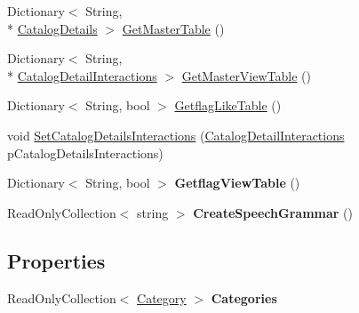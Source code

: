 \begin{DoxyCompactItemize}
\item 
Dictionary$<$ String, \\*
\hyperlink{class_microsoft_1_1_samples_1_1_kinect_1_1_basic_interactions_1_1_catalog_details}{Catalog\-Details} $>$ \hyperlink{class_microsoft_1_1_samples_1_1_kinect_1_1_basic_interactions_1_1_model_a2ac69e7c8492e2e2cc5f05e0161d93be}{Get\-Master\-Table} ()
\item 
Dictionary$<$ String, \\*
\hyperlink{class_microsoft_1_1_samples_1_1_kinect_1_1_basic_interactions_1_1_catalog_detail_interactions}{Catalog\-Detail\-Interactions} $>$ \hyperlink{class_microsoft_1_1_samples_1_1_kinect_1_1_basic_interactions_1_1_model_aa1f19e798038e6cbee46a436bd383e05}{Get\-Master\-View\-Table} ()
\item 
Dictionary$<$ String, bool $>$ \hyperlink{class_microsoft_1_1_samples_1_1_kinect_1_1_basic_interactions_1_1_model_ab18db1e36529e2e0be680ed79eac10fa}{Getflag\-Like\-Table} ()
\item 
void \hyperlink{class_microsoft_1_1_samples_1_1_kinect_1_1_basic_interactions_1_1_model_ad3fde59dd9d718855794ef7e2f98adad}{Set\-Catalog\-Details\-Interactions} (\hyperlink{class_microsoft_1_1_samples_1_1_kinect_1_1_basic_interactions_1_1_catalog_detail_interactions}{Catalog\-Detail\-Interactions} p\-Catalog\-Details\-Interactions)
\item 
\hypertarget{class_microsoft_1_1_samples_1_1_kinect_1_1_basic_interactions_1_1_model_a9e24fe88b4389b0fa84d39f70ee35a98}{Dictionary$<$ String, bool $>$ {\bfseries Getflag\-View\-Table} ()}\label{class_microsoft_1_1_samples_1_1_kinect_1_1_basic_interactions_1_1_model_a9e24fe88b4389b0fa84d39f70ee35a98}

\item 
\hypertarget{class_microsoft_1_1_samples_1_1_kinect_1_1_basic_interactions_1_1_model_a55996bb94a3087d5aa5b3906506d08c5}{Read\-Only\-Collection$<$ string $>$ {\bfseries Create\-Speech\-Grammar} ()}\label{class_microsoft_1_1_samples_1_1_kinect_1_1_basic_interactions_1_1_model_a55996bb94a3087d5aa5b3906506d08c5}

\end{DoxyCompactItemize}
\subsection*{Properties}
\begin{DoxyCompactItemize}
\item 
\hypertarget{class_microsoft_1_1_samples_1_1_kinect_1_1_basic_interactions_1_1_model_adcd8d6d55f5ea326727ba16c93f41b48}{Read\-Only\-Collection$<$ \hyperlink{class_microsoft_1_1_samples_1_1_kinect_1_1_basic_interactions_1_1_category}{Category} $>$ {\bfseries Categories}}\label{class_microsoft_1_1_samples_1_1_kinect_1_1_basic_interactions_1_1_model_adcd8d6d55f5ea326727ba16c93f41b48}

\end{DoxyCompactItemize}


